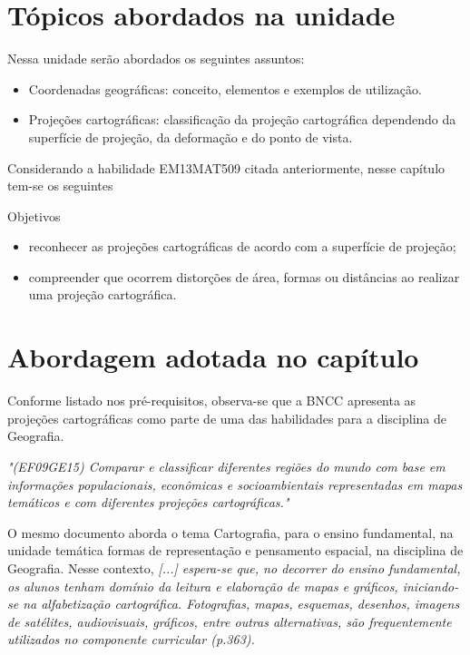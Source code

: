 \begin{apresentacao}
{\section*{Tópicos abordados na unidade}
Nessa unidade serão abordados os seguintes assuntos:
\begin{itemize}
\item Coordenadas geográficas: conceito, elementos e exemplos de utilização.
\item Projeções cartográficas: classificação da projeção cartográfica dependendo da superfície de projeção, da deformação e do ponto de vista.
\end{itemize}
	

Considerando a habilidade EM13MAT509 citada anteriormente, nesse capítulo tem-se os seguintes
\begin{habilities}{Objetivos}
\begin{itemize}
\item reconhecer as projeções cartográficas de acordo com a superfície de projeção;
\item compreender que ocorrem distorções de área, formas ou distâncias ao realizar uma projeção cartográfica. 
\end{itemize}
\end{habilities}

\section*{Abordagem adotada no capítulo}

Conforme listado nos pré-requisitos, observa-se que a BNCC  apresenta as projeções cartográficas como parte de uma das habilidades para a disciplina de Geografia.

\textit{"(EF09GE15) Comparar e classificar diferentes regiões do mundo com base em informações populacionais, econômicas e socioambientais representadas em mapas temáticos e com diferentes projeções cartográficas."{}\cite[p. 395]{BNCC2018}}

O mesmo documento aborda o tema Cartografia, para o ensino fundamental, na unidade temática formas de representação e pensamento espacial, na disciplina de Geografia. Nesse contexto, 
\textit{[...] espera-se que, no decorrer do ensino fundamental, os alunos tenham domínio da leitura e elaboração de mapas e gráficos, iniciando-se na alfabetização cartográfica. Fotografias, mapas, esquemas, desenhos, imagens de satélites, audiovisuais, gráficos, entre outras alternativas, são frequentemente utilizados no componente curricular (p.363). }

}
\end{apresentacao}
